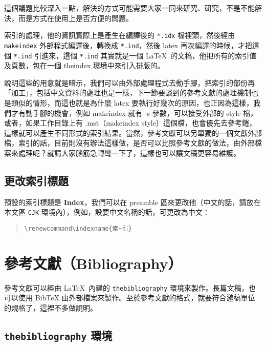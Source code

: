 這個議題比較深入一點，解決的方式可能需要大家一同來研究、研究，不是不能解決，而是方式在使用上是否方便的問題。

索引的處理，他的資訊實際上是產生在編譯後的 \texttt{*.idx} 檔裡頭，然後經由 \texttt{makeindex} 外部程式編譯後，轉換成 \texttt{*.ind}，然後 {\ttfamily latex} 再次編譯的時候，才把這個 \texttt{*.ind} 引進來，這個 \texttt{*.ind} 其實就是一個 \LaTeX\ 的文稿，他把所有的索引值及頁數，包在一個 {\ttfamily theindex} 環境中來引入排版的。

說明這些的用意就是暗示，我們可以由外部處理程式去動手腳，把索引的部份再「加工」，包括中文資料的處理也是一樣，下一節要談到的參考文獻的處理機制也是類似的情形，而這也就是為什麼 {\ttfamily latex} 要執行好幾次的原因，也正因為這樣，我們才有動手腳的機會，例如 {\ttfamily makeindex} 就有 {\ttfamily -s} 參數，可以接受外部的 style 檔，或者，如果工作目錄上有 {\ttfamily *.mst}（makeindex style）這個檔，也會優先去參考錈，這樣就可以產生不同形式的索引結果。當然，參考文獻可以另單獨的一個文獻外部檔，索引的話，目前則沒有辦法這樣做，是否可以比照參考文獻的做法，由外部檔案來處理呢？就請大家腦筋急轉彎一下了，這樣也可以讓文稿更容易維護。

\subsection{更改索引標題}

預設的索引標題是 \textbf{Index}，我們可以在 preamble 區來更改他（中文的話，請放在本文區 \texttt{CJK} 環境內），例如，設要中文名稱的話，可更改為中文：

\begin{quote}
  \begin{verbatim}
\renewcommand\indexname{索~引}
\end{verbatim}
\end{quote}


\section{參考文獻（Bibliography）}
\label{sec:biob}

參考文獻可以經由 \LaTeX\ 內建的 \texttt{thebibliography} 環境來製作。長篇文稿，也可以使用 Bib\TeX{} 由外部檔案來製作。至於參考文獻的格式，就要符合邀稿單位的規格了，這裡不多做說明。

\subsection{\texttt{thebibliography} 環境}
\label{subsec:thebibliography}

